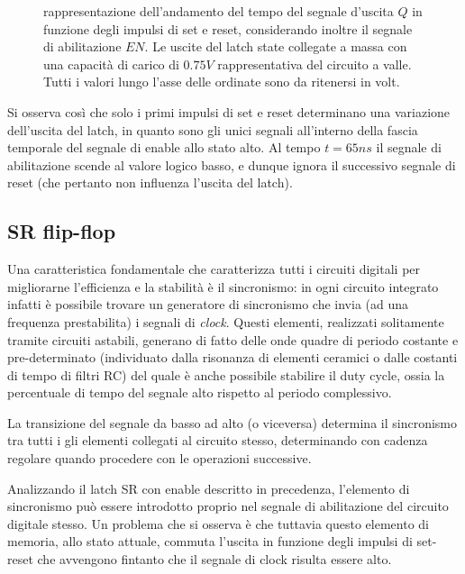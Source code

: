 	\begin{figure}[bht]
		\centering
		
		\caption{rappresentazione dell'andamento del tempo del segnale d'uscita $Q$ in funzione degli impulsi di set e reset, considerando inoltre il segnale di abilitazione $EN$. Le uscite del latch state collegate a massa con una capacità di carico di $0.
		75V$ rappresentativa del circuito a valle. Tutti i valori lungo l'asse delle ordinate sono da ritenersi in volt.}
		\label{fig:srl:transitorio-enable}
	\end{figure}
	
	Si osserva così che solo i primi impulsi di set e reset determinano una variazione dell'uscita del latch, in quanto sono gli unici segnali all'interno della fascia temporale del segnale di enable allo stato alto. Al tempo $t=65ns$ il segnale di abilitazione scende al valore logico basso, e dunque ignora il successivo segnale di reset (che pertanto non influenza l'uscita del latch).
	
\subsection*{SR flip-flop}
	Una caratteristica fondamentale che caratterizza tutti i circuiti digitali per migliorarne l'efficienza e la stabilità è il sincronismo: in ogni circuito integrato infatti è possibile trovare un generatore di sincronismo che invia (ad una frequenza prestabilita) i segnali di \textit{clock}. Questi elementi, realizzati solitamente tramite circuiti astabili, generano di fatto delle onde quadre di periodo costante e pre-determinato (individuato dalla risonanza di elementi ceramici o dalle costanti di tempo di filtri RC) del quale è anche possibile stabilire il duty cycle, ossia la percentuale di tempo del segnale alto rispetto al periodo complessivo.
	
	La transizione del segnale da basso ad alto (o viceversa) determina il sincronismo tra tutti i gli elementi collegati al circuito stesso, determinando con cadenza regolare quando procedere con le operazioni successive.
	
	Analizzando il latch SR con enable descritto in precedenza, l'elemento di sincronismo può essere introdotto proprio nel segnale di abilitazione del circuito digitale stesso. Un problema che si osserva è che tuttavia questo elemento di memoria, allo stato attuale, commuta l'uscita in funzione degli impulsi di set-reset che avvengono fintanto che il segnale di clock risulta essere alto.
	

